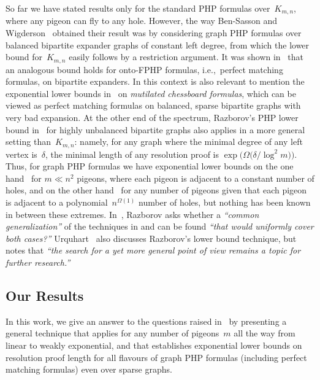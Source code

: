 \documentclass{article}
\newcommand{\Bigomega}[1]{\Omega \bigl( #1 \bigr)}
\newcommand{\bigomega}[1]{\Omega ( #1 )}
\newcommand{\introduceterm}[1]{{\emph{#1}}}
\newcommand{\ie}{i.e.,\ }
\newcommand{\quotepaper}[1]{\emph{``#1''}}
\newcommand{\squeezesubsection}[1]{\subsection{#1}}
\numberwithin{equation}{section}
\begin{document}
So far we have stated results only for the standard PHP formulas
over~$K_{m,n}$, where any pigeon can fly to any hole. 
However, the way Ben-Sasson and Wigderson~\cite{BW01ShortProofs}
obtained their result was by considering graph PHP formulas over balanced
bipartite expander graphs of constant left degree, from which the
lower bound for~$K_{m,n}$ easily follows by a restriction argument.
It was shown in~\cite{IOSS16} that an analogous bound holds for
onto-FPHP formulas, \ie perfect matching formulas, on bipartite expanders.
In this context is also relevant to mention the exponential lower
bounds in~\cite{Alekhnovich04Mutilated,DR01Planar} on 
\introduceterm{mutilated chessboard formulas}, which can be
viewed as perfect matching formulas on balanced, sparse bipartite
graphs with very bad expansion.
At the other end of the spectrum, Razborov's PHP lower bound
in~\cite{Razborov04ResolutionLowerBoundsPM} for highly unbalanced
bipartite graphs also applies in a more general  setting
than~$K_{m,n}$: namely, for 
any graph where the minimal degree of any left vertex
is~$\delta$, the minimal length of any resolution proof is
$\exp \bigl( \Bigomega{\delta / \log^2 m} \bigr)$.
Thus, for graph PHP formulas we have exponential lower bounds
on the one hand~\cite{BW01ShortProofs}
for $m \ll n^2$ pigeons, where each pigeon is
adjacent to a constant number of holes,
and on the other
hand~\cite{Razborov04ResolutionLowerBoundsPM} for
any number of pigeons
given that each pigeon is adjacent to a polynomial~$n^{\bigomega{1}}$
number of holes,
but nothing has been known in between these extremes.
In~\cite{Razborov04ResolutionLowerBoundsPM}, Razborov asks whether a
\quotepaper{common generalization} of the techniques in
\cite{BW01ShortProofs}
and
\cite{Razborov04ResolutionLowerBoundsPM,Razborov03ResolutionLowerBoundsWFPHP}
can be found
\quotepaper{that would uniformly cover both cases?}
Urquhart~\cite{Urquhart07WidthVsSize} also discusses Razborov's lower
bound technique, but notes that
\quotepaper{the search for a yet more general point of view remains a topic for
further research.}





   
\squeezesubsection{Our Results}

In this work, we give an answer to the questions raised
in~\cite{Razborov04ResolutionLowerBoundsPM,Urquhart07WidthVsSize} by
presenting a general technique that applies for any number of
pigeons~$m$ all the way from linear to weakly exponential, and that
establishes exponential lower bounds on resolution proof length for
all flavours of graph PHP formulas (including perfect matching
formulas) even over sparse graphs.
\end{document}
